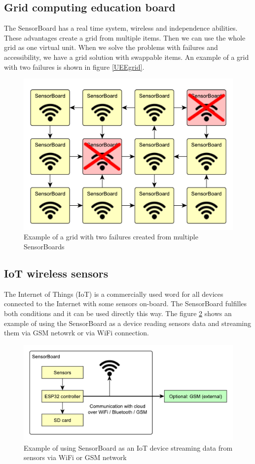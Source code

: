\subsection{Grid computing education board}
\label{ExampleGrid}
The SensorBoard has a real time system, wireless and independence abilities. These advantages create a grid from multiple items. Then we can use the whole grid as one virtual unit. When we solve the problems with failures and accessibility, we have a grid solution with swappable items. An example of a grid with two failures is shown in figure \ref{UEEgrid}.

\begin{figure}[H]
	\centering
	\label{UEgrid}
	\caption{Example of a grid with two failures created from multiple SensorBoards}
	\includegraphics[width=16cm]{img/UsageExamplesGrid.pdf}
\end{figure}

\subsection{IoT wireless sensors}
The Internet of Things (IoT) is a commercially used word for all devices connected to the Internet with some sensors on-board. The SensorBoard fulfilles both conditions and it can be used directly this way. The figure \ref{UEIoT} shows an example of using the SensorBoard as a device reading sensors data and streaming them via GSM netowrk or via WiFi connection.

\begin{figure}[H]
	\centering
	\label{UEIoT}
	\caption{Example of using SensorBoard as an IoT device streaming data from sensors via WiFi or GSM network}
	\includegraphics[width=16cm]{img/UsageExamplesIoT.pdf}
\end{figure}

